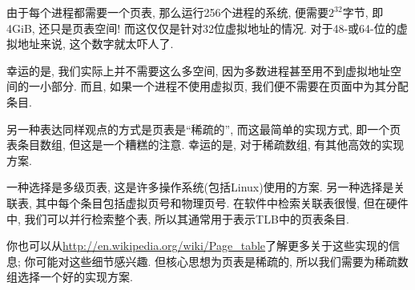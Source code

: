 \documentclass[12pt]{book}
\begin{document}
{由于每个进程都需要一个页表, 
那么运行256个进程的系统, 便需要$2^{32}$字节, 即 4GiB, 还只是页表空间!
而这仅仅是针对32位虚拟地址的情况.
对于48-或64-位的虚拟地址来说, 这个数字就太吓人了.


%
%
幸运的是, 我们实际上并不需要这么多空间,
因为多数进程甚至用不到虚拟地址空间的一小部分.
而且, 如果一个进程不使用虚拟页, 我们便不需要在页面中为其分配条目.

另一种表达同样观点的方式是页表是``稀疏的'',
而这最简单的实现方式, 即一个页表条目数组, 但这是一个糟糕的注意.
幸运的是, 对于稀疏数组, 有其他高效的实现方案.

一种选择是多级页表, 这是许多操作系统(包括Linux)使用的方案.
另一种选择是关联表, 其中每个条目包括虚拟页号和物理页号.
在软件中检索关联表很慢, 但在硬件中, 我们可以并行检索整个表,
所以其通常用于表示TLB中的页表条目.


%
你也可以从\url{http://en.wikipedia.org/wiki/Page_table}了解更多关于这些实现的信息;
你可能对这些细节感兴趣.
但核心思想为页表是稀疏的, 所以我们需要为稀疏数组选择一个好的实现方案.

}
\end{document}
